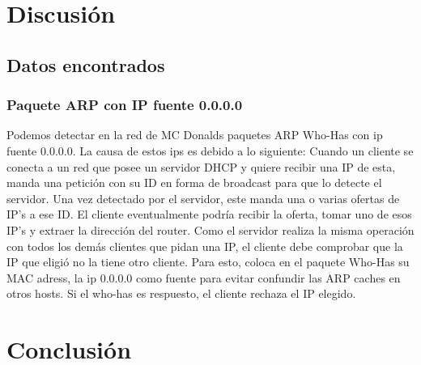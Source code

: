 \documentclass[a4paper, 10pt, twoside]{article}
\begin{document}
\section{Discusión}

\subsection{Datos encontrados}
\subsubsection{Paquete ARP con IP fuente 0.0.0.0}
Podemos detectar en la red de MC Donalds paquetes ARP Who-Has con ip fuente 0.0.0.0.
La causa de estos ips es debido a lo siguiente:
Cuando un cliente se conecta a un red que posee un servidor DHCP y quiere recibir una IP de esta, manda una petición con su ID en forma de broadcast para que lo detecte el servidor. Una vez detectado por el servidor, este manda una o varias ofertas de IP's a ese ID.
El cliente eventualmente podría recibir la oferta, tomar uno de esos IP's y extraer la dirección del router.
Como el servidor realiza la misma operación con todos los demás clientes que pidan una IP, el cliente debe comprobar que la IP que eligió no la tiene otro cliente. Para esto, coloca en el paquete Who-Has su MAC adress, la ip 0.0.0.0 como fuente para evitar confundir las ARP caches en otros hosts. Si el who-has es respuesto, el cliente rechaza el IP elegido.





\section{Conclusión}
\end{document}

